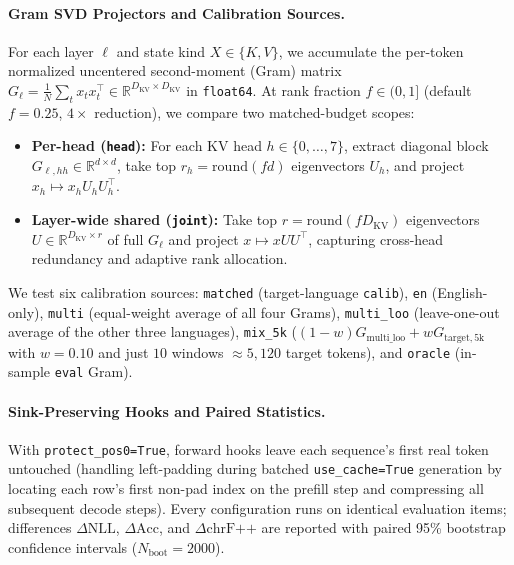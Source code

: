 \documentclass[11pt,a4paper,twocolumn]{article}
\begin{document}
\paragraph{Gram SVD Projectors and Calibration Sources.}
For each layer $\ell$ and state kind $X \in \{K, V\}$, we accumulate the per-token normalized uncentered second-moment (Gram) matrix $G_\ell = \frac{1}{N} \sum_{t} x_t x_t^\top \in \mathbb{R}^{D_{\text{KV}} \times D_{\text{KV}}}$ in \texttt{float64}. At rank fraction $f \in (0, 1]$ (default $f=0.25$, $4\times$ reduction), we compare two matched-budget scopes:
\begin{itemize}
  \item \textbf{Per-head (\texttt{head}):} For each KV head $h \in \{0,\dots,7\}$, extract diagonal block $G_{\ell,hh} \in \mathbb{R}^{d\times d}$, take top $r_h = \mathrm{round}(f d)$ eigenvectors $U_h$, and project $x_h \mapsto x_h U_h U_h^\top$.
  \item \textbf{Layer-wide shared (\texttt{joint}):} Take top $r = \mathrm{round}(f D_{\text{KV}})$ eigenvectors $U \in \mathbb{R}^{D_{\text{KV}}\times r}$ of full $G_\ell$ and project $x \mapsto x U U^\top$, capturing cross-head redundancy and adaptive rank allocation.
\end{itemize}
We test six calibration sources: \texttt{matched} (target-language \texttt{calib}), \texttt{en} (English-only), \texttt{multi} (equal-weight average of all four Grams), \texttt{multi\_loo} (leave-one-out average of the other three languages), \texttt{mix\_5k} ($(1-w)G_{\text{multi\_loo}} + w G_{\text{target},5\text{k}}$ with $w=0.10$ and just $10$ windows $\approx 5{,}120$ target tokens), and \texttt{oracle} (in-sample \texttt{eval} Gram).

\paragraph{Sink-Preserving Hooks and Paired Statistics.}
With \texttt{protect\_pos0=True}, forward hooks leave each sequence's first real token untouched (handling left-padding during batched \texttt{use\_cache=True} generation by locating each row's first non-pad index on the prefill step and compressing all subsequent decode steps). Every configuration runs on identical evaluation items; differences $\Delta\text{NLL}$, $\Delta\text{Acc}$, and $\Delta\text{chrF++}$ are reported with paired 95\% bootstrap confidence intervals ($N_{\text{boot}}=2000$).

\end{document}
